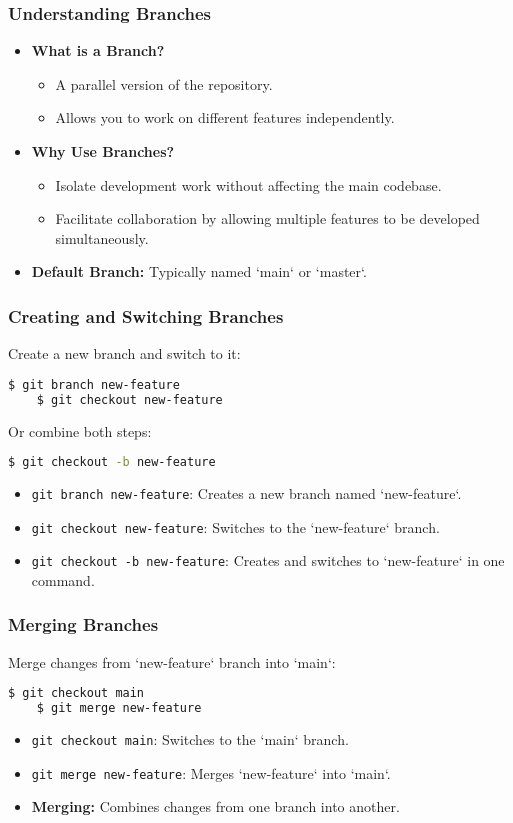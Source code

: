 \begin{frame}
	\frametitle{Understanding Branches}
	\begin{itemize}
		\item \textbf{What is a Branch?}
		\begin{itemize}
			\item A parallel version of the repository.
			\item Allows you to work on different features independently.
		\end{itemize}
		\item \textbf{Why Use Branches?}
		\begin{itemize}
			\item Isolate development work without affecting the main codebase.
			\item Facilitate collaboration by allowing multiple features to be developed simultaneously.
		\end{itemize}
		\item \textbf{Default Branch:} Typically named `main` or `master`.
	\end{itemize}
\end{frame}

\begin{frame}[fragile]
	\frametitle{Creating and Switching Branches}
	Create a new branch and switch to it:
	\begin{lstlisting}[language=bash]
	$ git branch new-feature
	$ git checkout new-feature
	\end{lstlisting}
	Or combine both steps:
	\begin{lstlisting}[language=bash]
	$ git checkout -b new-feature
	\end{lstlisting}
	\begin{itemize}
		\item \texttt{git branch new-feature}: Creates a new branch named `new-feature`.
		\item \texttt{git checkout new-feature}: Switches to the `new-feature` branch.
		\item \texttt{git checkout -b new-feature}: Creates and switches to `new-feature` in one command.
	\end{itemize}
\end{frame}

\begin{frame}[fragile]
	\frametitle{Merging Branches}
	Merge changes from `new-feature` branch into `main`:
	\begin{lstlisting}[language=bash]
	$ git checkout main
	$ git merge new-feature
	\end{lstlisting}
	\begin{itemize}
		\item \texttt{git checkout main}: Switches to the `main` branch.
		\item \texttt{git merge new-feature}: Merges `new-feature` into `main`.
		\item \textbf{Merging:} Combines changes from one branch into another.
	\end{itemize}
\end{frame}

